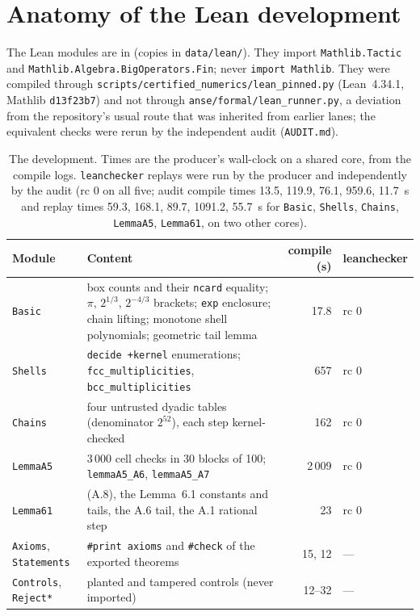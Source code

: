 \documentclass[11pt]{article}
\newcommand{\lean}[1]{\texttt{#1}}
\begin{document}
\section{Anatomy of the Lean development}\label{sec:leandev}
The Lean modules are in  (copies in \texttt{data/lean/}). They import \lean{Mathlib.Tactic} and \lean{Mathlib.Algebra.BigOperators.Fin}; never \lean{import Mathlib}.
They were compiled through \texttt{scripts/certified\_numerics/lean\_pinned.py} (Lean~4.34.1, Mathlib \texttt{d13f23b7}) and not through \texttt{anse/formal/lean\_runner.py}, a deviation from the repository's usual route that was
inherited from earlier lanes; the equivalent checks were rerun by the independent audit (\texttt{AUDIT.md}).
\begin{table}[ht]\centering\small
\begin{tabular}{@{}lp{8.6cm}rl@{}}\toprule
Module & Content & compile (s) & leanchecker\\\midrule
\lean{Basic} & box counts and their \lean{ncard} equality; $\pi$, $2^{1/3}$, $2^{-4/3}$ brackets; \lean{exp} enclosure; chain lifting; monotone shell polynomials; geometric tail lemma & 17.8 & rc 0\\
\lean{Shells} & \lean{decide +kernel} enumerations; \lean{fcc\_multiplicities}, \lean{bcc\_multiplicities} & 657 & rc 0\\
\lean{Chains} & four untrusted dyadic tables (denominator $2^{52}$), each step kernel-checked & 162 & rc 0\\
\lean{LemmaA5} & 3\,000 cell checks in 30 blocks of 100; \lean{lemmaA5\_A6}, \lean{lemmaA5\_A7} & 2\,009 & rc 0\\
\lean{Lemma61} & (A.8), the Lemma~6.1 constants and tails, the A.6 tail, the A.1 rational step & 23 & rc 0\\
\lean{Axioms}, \lean{Statements} & \lean{\#print axioms} and \lean{\#check} of the exported theorems & 15, 12 & ---\\
\lean{Controls}, \lean{Reject*} & planted and tampered controls (never imported) & 12--32 & ---\\\bottomrule
\end{tabular}
\caption{The development. Times are the producer's wall-clock on a shared core, from the compile logs. \texttt{leanchecker} replays were run by the producer and independently by the audit (rc 0 on all five; audit compile times 13.5, 119.9, 76.1, 959.6, 11.7~s and replay times 59.3, 168.1, 89.7, 1091.2, 55.7~s for \lean{Basic}, \lean{Shells}, \lean{Chains}, \lean{LemmaA5}, \lean{Lemma61}, on two other cores).}
\end{table}
\end{document}
